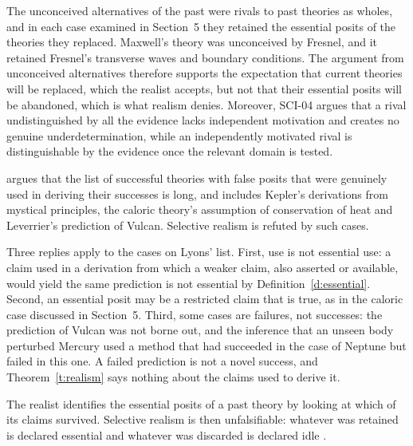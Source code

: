 \documentclass{situationist-preprint}
\begin{document}
\begin{reply}
The unconceived alternatives of the past were rivals to past theories as wholes, and in each case examined in Section~5 they retained the essential posits of the theories they replaced. Maxwell's theory was unconceived by Fresnel, and it retained Fresnel's transverse waves and boundary conditions. The argument from unconceived alternatives therefore supports the expectation that current theories will be replaced, which the realist accepts, but not that their essential posits will be abandoned, which is what realism denies. Moreover, SCI-04 argues that a rival undistinguished by all the evidence lacks independent motivation and creates no genuine underdetermination, while an independently motivated rival is distinguishable by the evidence once the relevant domain is tested.
\end{reply}

\begin{objection}
\citet{Lyons2006} argues that the list of successful theories with false posits that were genuinely used in deriving their successes is long, and includes Kepler's derivations from mystical principles, the caloric theory's assumption of conservation of heat and Leverrier's prediction of Vulcan. Selective realism is refuted by such cases.
\end{objection}

\begin{reply}
Three replies apply to the cases on Lyons' list. First, use is not essential use: a claim used in a derivation from which a weaker claim, also asserted or available, would yield the same prediction is not essential by Definition~\ref{d:essential}. Second, an essential posit may be a restricted claim that is true, as in the caloric case discussed in Section~5. Third, some cases are failures, not successes: the prediction of Vulcan was not borne out, and the inference that an unseen body perturbed Mercury used a method that had succeeded in the case of Neptune but failed in this one. A failed prediction is not a novel success, and Theorem~\ref{t:realism} says nothing about the claims used to derive it.
\end{reply}

\begin{objection}
The realist identifies the essential posits of a past theory by looking at which of its claims survived. Selective realism is then unfalsifiable: whatever was retained is declared essential and whatever was discarded is declared idle \citep{Stanford2006,Chang2003}.
\end{objection}
\end{document}
